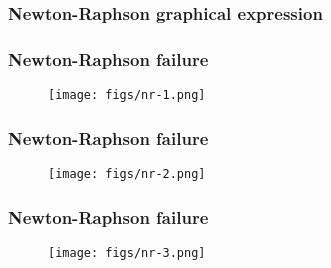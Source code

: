 \documentclass[notes]{beamer}
\begin{document}
\begin{frame}
	\frametitle{Newton-Raphson graphical expression}
\end{frame}

\begin{frame}
	\frametitle{Newton-Raphson failure}
	\begin{figure}[ht]
		\centering
		\texttt{[image: figs/nr-1.png]}
	\end{figure}
\end{frame}


\begin{frame}
	\frametitle{Newton-Raphson failure}
	\begin{figure}[ht]
		\centering
		\texttt{[image: figs/nr-2.png]}
	\end{figure}
\end{frame}

\begin{frame}
	\frametitle{Newton-Raphson failure}
	\begin{figure}[ht]
		\centering
		\texttt{[image: figs/nr-3.png]}
	\end{figure}
\end{frame}
\end{document}

